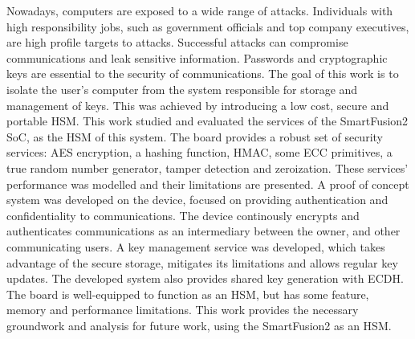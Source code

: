 \noindent Nowadays, computers are exposed to a wide range of attacks. Individuals with high responsibility jobs, such as government officials and top company executives, are high profile targets to attacks. Successful attacks can compromise communications and leak sensitive information. Passwords and cryptographic keys are essential to the security of communications. The goal of this work is to isolate the user's computer from the system responsible for storage and management of keys. This was achieved by introducing a low cost, secure and portable \ac{HSM}. This work studied and evaluated the services of the SmartFusion2 \ac{SoC}, as the HSM of this system. The board provides a robust set of security services: AES encryption, a hashing function, HMAC, some ECC primitives, a true random number generator, tamper detection and zeroization. These services' performance was modelled and their limitations are presented. A proof of concept system was developed on the device, focused on providing authentication and confidentiality to communications. The device continously encrypts and authenticates communications as an intermediary between the owner, and other communicating users. A key management service was developed, which takes advantage of the secure storage, mitigates its limitations and allows regular key updates. The developed system also provides shared key generation with ECDH. The board is well-equipped to function as an HSM, but has some feature, memory and performance limitations. This work provides the necessary groundwork and analysis for future work, using the SmartFusion2 as an HSM.

